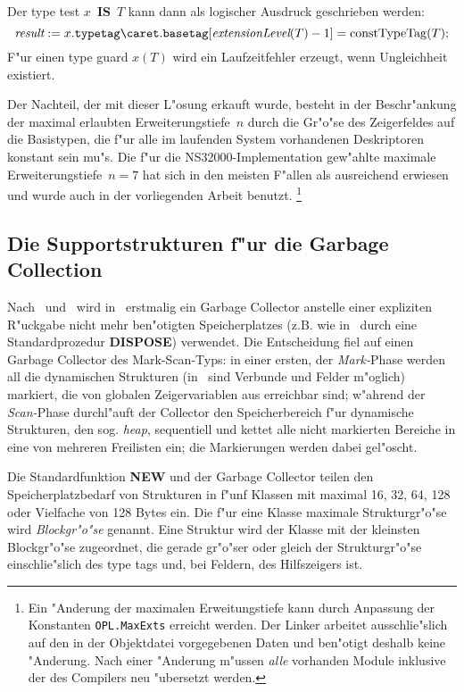Der type test $x$~{\bf IS}~$T$ kann dann als logischer Ausdruck geschrieben werden:
\[ \hbox{\it result} := x.\hbox{\tt typetag\/}\caret.\hbox{\tt basetag}[\hbox{\it extensionLevel}(T)-1] = \hbox{constTypeTag\/}(T);\]
F"ur einen type guard $x(T)$ wird ein Laufzeitfehler erzeugt, wenn Ungleichheit
existiert.

Der Nachteil, der mit dieser L"osung erkauft wurde, besteht in der Beschr"ankung
der maximal erlaubten Erweiterungstiefe~$n$ durch die Gr"o"se des Zeigerfeldes auf
die Basistypen, die f"ur alle im laufenden System vorhandenen Deskriptoren
konstant sein mu"s.
Die f"ur die NS32000-Implementation gew"ahlte maximale Erweiterungstiefe~$n=7$
hat sich in den meisten F"allen als ausreichend erwiesen und wurde auch
in der vorliegenden Arbeit benutzt.%
\footnote{Ein "Anderung der maximalen Erweitungstiefe kann durch Anpassung
der Konstanten {\tt OPL.MaxExts} erreicht werden.
Der Linker arbeitet ausschlie"slich auf den in der Objektdatei vorgegebenen
Daten und ben"otigt deshalb keine "Anderung.
Nach einer "Anderung m"ussen {\em alle\/} vorhanden Module inklusive der des
Compilers neu "ubersetzt werden.}

\subsection{Die Supportstrukturen f"ur die Garbage Collection}
\label{Supportstrukturen}

Nach \pascal\ und \modula\ wird in \oberon\ erstmalig ein Garbage Collector
anstelle einer expliziten R"uckgabe nicht mehr ben"otigten Speicherplatzes
(z.B. wie in \modula\ durch eine Standardprozedur {\bf DISPOSE}) verwendet.
Die Entscheidung fiel auf einen Garbage Collector des Mark-Scan-Typs:
in einer ersten, der {\em Mark-}Phase werden all die dynamischen Strukturen (in \oberon\
sind Verbunde und Felder m"oglich) markiert, die von globalen Zeigervariablen
aus erreichbar sind; w"ahrend der {\em Scan-}Phase durchl"auft der Collector
den Speicherbereich f"ur dynamische Strukturen, den sog. {\it heap}, sequentiell
und kettet alle nicht markierten Bereiche in eine von mehreren Freilisten ein;
die Markierungen werden dabei gel"oscht.

Die Standardfunktion {\bf NEW} und der Garbage Collector teilen den
Speicherplatzbedarf von Strukturen in f"unf Klassen mit
maximal 16, 32, 64, 128 oder Vielfache von 128 Bytes ein.
Die f"ur eine Klasse maximale Strukturgr"o"se wird {\em Blockgr"o"se\/}
genannt.
Eine Struktur wird der Klasse mit der kleinsten Blockgr"o"se zugeordnet,
die gerade gr"o"ser oder gleich der Strukturgr"o"se einschlie"slich des
type tags und, bei Feldern, des Hilfszeigers ist.\cite[S. 871]{oberonSystem}

